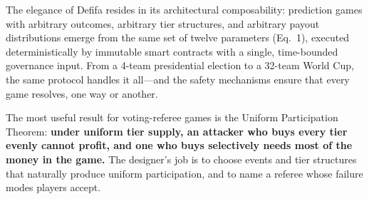 \documentclass[11pt,a4paper]{article}
\begin{document}
The elegance of Defifa resides in its architectural composability: prediction games with arbitrary outcomes, arbitrary tier structures, and arbitrary payout distributions emerge from the same set of twelve parameters (Eq.~1), executed deterministically by immutable smart contracts with a single, time-bounded governance input. From a 4-team presidential election to a 32-team World Cup, the same protocol handles it all---and the safety mechanisms ensure that every game resolves, one way or another.

The most useful result for voting-referee games is the Uniform Participation Theorem: \textbf{under uniform tier supply, an attacker who buys every tier evenly cannot profit, and one who buys selectively needs most of the money in the game.} The designer's job is to choose events and tier structures that naturally produce uniform participation, and to name a referee whose failure modes players accept.
\end{document}
